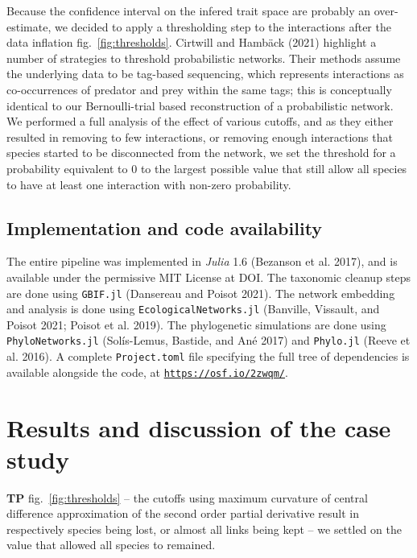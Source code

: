 \documentclass[11pt]{article}
\begin{document}
Because the confidence interval on the infered trait space are probably
an over-estimate, we decided to apply a thresholding step to the
interactions after the data inflation fig.~\ref{fig:thresholds}.
Cirtwill and Hambäck (2021) highlight a number of strategies to
threshold probabilistic networks. Their methods assume the underlying
data to be tag-based sequencing, which represents interactions as
co-occurrences of predator and prey within the same tags; this is
conceptually identical to our Bernoulli-trial based reconstruction of a
probabilistic network. We performed a full analysis of the effect of
various cutoffs, and as they either resulted in removing to few
interactions, or removing enough interactions that species started to be
disconnected from the network, we set the threshold for a probability
equivalent to 0 to the largest possible value that still allow all
species to have at least one interaction with non-zero probability.

\hypertarget{implementation-and-code-availability}{%
\subsection{Implementation and code
availability}\label{implementation-and-code-availability}}

The entire pipeline was implemented in \emph{Julia} 1.6 (Bezanson et al.
2017), and is available under the permissive MIT License at DOI. The
taxonomic cleanup steps are done using \texttt{GBIF.jl} (Dansereau and
Poisot 2021). The network embedding and analysis is done using
\texttt{EcologicalNetworks.jl} (Banville, Vissault, and Poisot 2021;
Poisot et al. 2019). The phylogenetic simulations are done using
\texttt{PhyloNetworks.jl} (Solís-Lemus, Bastide, and Ané 2017) and
\texttt{Phylo.jl} (Reeve et al. 2016). A complete \texttt{Project.toml}
file specifying the full tree of dependencies is available alongside the
code, at \href{https://osf.io/2zwqm/}{\texttt{https://osf.io/2zwqm/}}.

\hypertarget{results-and-discussion-of-the-case-study}{%
\section{Results and discussion of the case
study}\label{results-and-discussion-of-the-case-study}}

\textbf{TP} fig.~\ref{fig:thresholds} -- the cutoffs using maximum
curvature of central difference approximation of the second order
partial derivative result in respectively species being lost, or almost
all links being kept -- we settled on the value that allowed all species
to remained.
\end{document}
